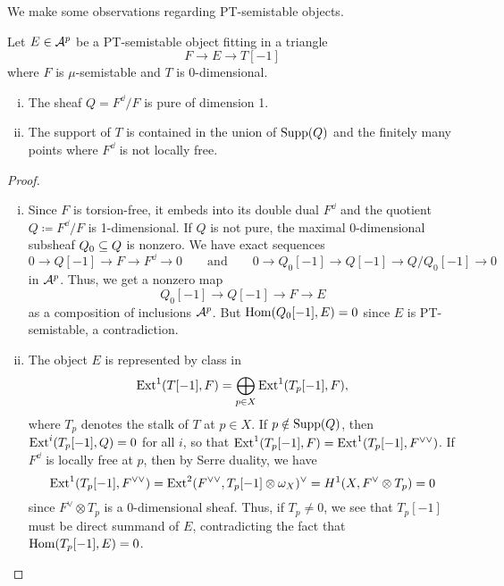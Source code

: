We make some observations regarding PT-semistable objects.
\begin{lem}\label{Qpure1dim-suppT}
Let $E \in \mathcal{A}^p$ be a PT-semistable object fitting in a triangle
\[ F \to E \to T[-1] \]
where $F$ is $\mu$-semistable and $T$ is 0-dimensional.
\begin{enumerate}[(i)]
    \item The sheaf $Q = F^\dd/F$ is pure of dimension 1.
    \item The support of $T$ is contained in the union of $\operatorname{\mathrm{Supp}}(Q)$ and the finitely many points where $F^\dd$ is not locally free.
\end{enumerate}
\end{lem}
\begin{proof}
\begin{enumerate}[(i)]
    \item Since $F$ is torsion-free, it embeds into its double dual $F^\dd$ and the quotient $Q \coloneqq F^\dd/F$ is 1-dimensional. If $Q$ is not pure, the maximal 0-dimensional subsheaf $Q_0 \subseteq Q$ is nonzero. We have exact sequences
    \[ 0 \to Q[-1] \to F \to F^\dd \to 0 \qquad \text{and} \qquad 0 \to Q_0[-1] \to Q[-1] \to Q/Q_0[-1] \to 0 \]
    in $\mathcal{A}^p$. Thus, we get a nonzero map
    \[ Q_0[-1] \to Q[-1] \to F \to E \]
    as a composition of inclusions $\mathcal{A}^p$. But $\mathrm{Hom}(Q_0[-1], E) = 0$ since $E$ is PT-semistable, a contradiction.
    
    \item The object $E$ is represented by class in
    \[ \mathrm{Ext}^1(T[-1], F) = \bigoplus_{p \in X} \mathrm{Ext}^1(T_p[-1], F), \]
    where $T_p$ denotes the stalk of $T$ at $p \in X$. If $p \notin \operatorname{\mathrm{Supp}}(Q)$, then $\mathrm{Ext}^i(T_p[-1], Q) = 0$ for all $i$, so that $\mathrm{Ext}^1(T_p[-1], F) = \mathrm{Ext}^1(T_p[-1], F^{\vee\vee})$. If $F^\dd$ is locally free at $p$, then by Serre duality, we have
    \[ \mathrm{Ext}^1(T_p[-1], F^{\vee\vee}) = \mathrm{Ext}^2(F^{\vee\vee}, T_p[-1] \otimes \omega_X)^\vee = H^1(X, F^\vee \otimes T_p) = 0 \]
    since $F^\vee \otimes T_p$ is a 0-dimensional sheaf. Thus, if $T_p \neq 0$, we see that $T_p[-1]$ must be direct summand of $E$, contradicting the fact that $\mathrm{Hom}(T_p[-1], E) = 0$.
\end{enumerate}
\end{proof}


